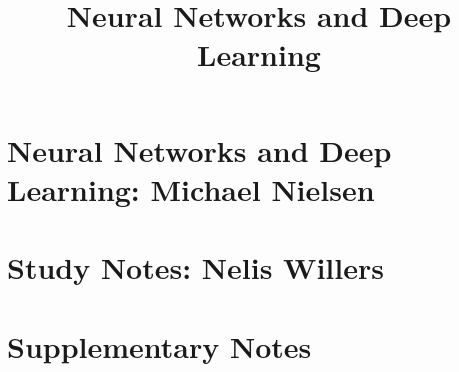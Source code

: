 \documentclass[a4,nobib]{tufte-book}
\title{Neural Networks and Deep Learning}
\author{}
\begin{document}
\part{Neural Networks and Deep Learning: Michael Nielsen}
\part{Study Notes: Nelis Willers}
\part{Supplementary Notes}
\end{document}
